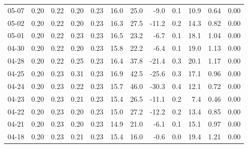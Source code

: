 \begin{threeparttable}
{\begin{tabular}{lrrrrrrrrrrr}
  05-07 &          0.20 &          0.22 &          0.20 &        0.23 &                16.0 &                25.0 &       -9.0 &                 0.1 &             10.9 &            0.64 &                   0.00 \\
  05-02 &          0.20 &          0.22 &          0.20 &        0.23 &                16.3 &                27.5 &      -11.2 &                 0.2 &             14.3 &            0.82 &                   0.00 \\
  05-01 &          0.20 &          0.22 &          0.23 &        0.23 &                16.5 &                23.2 &       -6.7 &                 0.1 &             18.1 &            1.04 &                   0.00 \\
  04-30 &          0.20 &          0.22 &          0.20 &        0.23 &                15.8 &                22.2 &       -6.4 &                 0.1 &             19.0 &            1.13 &                   0.00 \\
  04-28 &          0.20 &          0.22 &          0.25 &        0.23 &                16.4 &                37.8 &      -21.4 &                 0.3 &             20.1 &            1.17 &                   0.00 \\
  04-25 &          0.20 &          0.23 &          0.31 &        0.23 &                16.9 &                42.5 &      -25.6 &                 0.3 &             17.1 &            0.96 &                   0.00 \\
  04-24 &          0.20 &          0.23 &          0.22 &        0.23 &                15.7 &                46.0 &      -30.3 &                 0.4 &             12.1 &            0.72 &                   0.00 \\
  04-23 &          0.20 &          0.23 &          0.21 &        0.23 &                15.4 &                26.5 &      -11.1 &                 0.2 &              7.4 &            0.46 &                   0.00 \\
  04-22 &          0.20 &          0.23 &          0.20 &        0.23 &                15.0 &                27.2 &      -12.2 &                 0.2 &             13.4 &            0.85 &                   0.00 \\
  04-21 &          0.20 &          0.23 &          0.20 &        0.23 &                14.9 &                21.0 &       -6.1 &                 0.1 &             15.1 &            0.97 &                   0.00 \\
  04-18 &          0.20 &          0.23 &          0.21 &        0.23 &                15.4 &                16.0 &       -0.6 &                 0.0 &             19.4 &            1.21 &                   0.00 \\

\end{tabular}}
\end{threeparttable}
